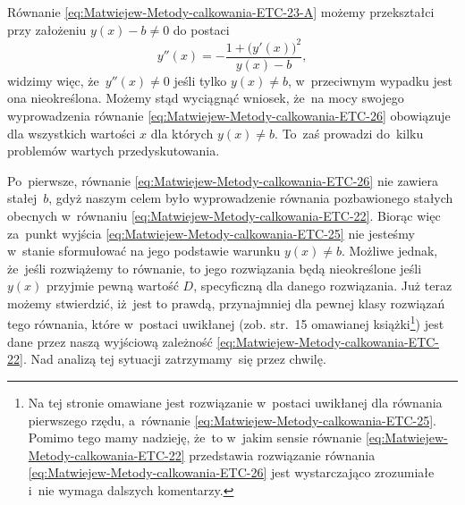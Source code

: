 \documentclass[a4paper,11pt]{article}
\numberwithin{equation}{section}
\begin{document}
Równanie \eqref{eq:Matwiejew-Metody-calkowania-ETC-23-A} możemy przekształci
przy założeniu $y( x ) - b \neq 0$ do postaci
\begin{equation}
  \label{eq:Matwiejew-Metody-calkowania-ETC-27}
  y''( x ) =
  -\frac{ 1 + \big( y'( x ) \big)^{ 2 } }{ y( x ) - b },
\end{equation}
widzimy więc, że~$y''( x ) \neq 0$ jeśli tylko $y( x ) \neq b$, w~przeciwnym
wypadku jest ona nieokreślona. Możemy stąd wyciągnąć wniosek,
że~na mocy swojego wyprowadzenia równanie
\eqref{eq:Matwiejew-Metody-calkowania-ETC-26} obowiązuje dla wszystkich
wartości $x$ dla których $y( x ) \neq b$. To~zaś prowadzi do~kilku problemów
wartych przedyskutowania.

Po~pierwsze, równanie \eqref{eq:Matwiejew-Metody-calkowania-ETC-26} nie
zawiera stałej~$b$, gdyż naszym celem było wyprowadzenie równania
pozbawionego stałych obecnych w~równaniu
\eqref{eq:Matwiejew-Metody-calkowania-ETC-22}. Biorąc więc za~punkt wyjścia
\eqref{eq:Matwiejew-Metody-calkowania-ETC-25} nie jesteśmy w~stanie
sformułować na jego podstawie warunku $y( x ) \neq b$. Możliwe jednak, że~jeśli
rozwiążemy to równanie, to jego rozwiązania będą nieokreślone jeśli $y( x )$
przyjmie pewną wartość $D$, specyficzną dla danego rozwiązania. Już teraz
możemy stwierdzić, iż~jest to prawdą, przynajmniej dla pewnej klasy
rozwiązań tego równania, które w~postaci uwikłanej (zob. str.~15 omawianej
książki\footnote{Na tej stronie omawiane jest rozwiązanie w~postaci
  uwikłanej dla równania pierwszego rzędu, a~równanie
  \eqref{eq:Matwiejew-Metody-calkowania-ETC-25}. Pomimo tego mamy nadzieję,
  że~to w~jakim sensie równanie
  \eqref{eq:Matwiejew-Metody-calkowania-ETC-22} przedstawia rozwiązanie
  równania \eqref{eq:Matwiejew-Metody-calkowania-ETC-26} jest wystarczająco
  zrozumiałe i~nie wymaga dalszych komentarzy.}) jest dane przez naszą
wyjściową zależność
\eqref{eq:Matwiejew-Metody-calkowania-ETC-22}. Nad analizą tej sytuacji
zatrzymamy~się przez chwilę.
\end{document}
